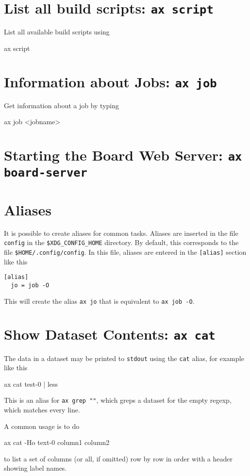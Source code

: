 \section{List all build scripts: \texttt{ax script}}
List all available build scripts using
\begin{shell}
ax script
\end{shell}


\section{Information about Jobs: \texttt{ax job}}
Get information about a job by typing
\begin{shell}
ax job <jobname>
\end{shell}


\section{Starting the Board Web Server: \texttt{ax board-server}}



\section{Aliases}
It is possible to create aliases for common tasks.  Aliases are
inserted in the file \texttt{config} in the \texttt{\$XDG\_CONFIG\_HOME}
directory.  By default, this corresponds to the file \texttt{\$HOME/.config/config}.
In this file, aliases are entered in the \texttt{[alias]} section like this
\begin{verbatim}
[alias]
  jo = job -O
\end{verbatim}
This will create the alias \texttt{ax jo} that is equivalent to
\texttt{ax job -O}.



\section{Show Dataset Contents: \texttt{ax cat}}
The data in a dataset may be printed to \texttt{stdout} using the
\texttt{cat} alias, for example like this
\begin{shell}
ax cat test-0 | less
\end{shell}
This is an alias for \texttt{ax grep ""}, which greps a dataset for the
empty regexp, which matches every line.

A common usage is to do
\begin{shell}
ax cat -Ho text-0 column1 column2
\end{shell}
to list a set of columns (or all, if omitted) row by row in order with
a header showing label names.



